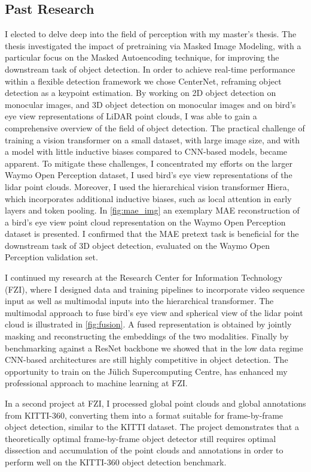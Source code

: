 


 \subsection{\textbf{Past Research}}
 I elected to delve deep into the field of perception with my master's thesis. The thesis investigated the impact of pretraining via Masked Image Modeling, with a particular focus on the Masked Autoencoding \cite{mae} technique, for improving the downstream task of object detection. In order to achieve real-time performance within a flexible detection framework we chose CenterNet, reframing object detection as a keypoint estimation. By working on 2D object detection on monocular images, and 3D object detection on monocular images and on bird's eye view representations of LiDAR point clouds, I was able to gain a comprehensive overview of the field of object detection. 
 The practical challenge of training a vision transformer on a small dataset, with large image size, and with a model with little inductive biases compared to CNN-based models, became apparent. To mitigate these challenges, I concentrated my efforts on the larger Waymo Open Perception dataset, I used bird's eye view representations of the lidar point clouds. Moreover, I used the hierarchical vision transformer Hiera, which incorporates additional inductive biases, such as local attention in early layers and token pooling.
 In \autoref{fig:mae_img} an exemplary MAE reconstruction of a bird's eye view point cloud representation on the Waymo Open Perception dataset is presented. I confirmed that the MAE pretext task is beneficial for the downstream task of 3D object detection, evaluated on the Waymo Open Perception validation set.

I continued my research at the Research Center for Information Technology (FZI), where I designed data and training pipelines to incorporate video sequence input as well as multimodal inputs into the hierarchical transformer. The multimodal approach to fuse bird's eye view and spherical view of the lidar point cloud is illustrated in \autoref{fig:fusion}. A fused representation is obtained by jointly masking and reconstructing the embeddings of the two modalities. Finally by benchmarking against a ResNet backbone we showed that in the low data regime CNN-based architectures are still highly competitive in object detection. The opportunity to train on the Jülich Supercomputing Centre, has enhanced my professional approach to machine learning at FZI.

In a second project at FZI, I processed global point clouds and global annotations from KITTI-360, converting them into a format suitable for frame-by-frame object detection, similar to the KITTI dataset. The project demonstrates that a theoretically optimal frame-by-frame object detector still requires optimal dissection and accumulation of the point clouds and annotations in order to perform well on the KITTI-360 object detection benchmark.

 





